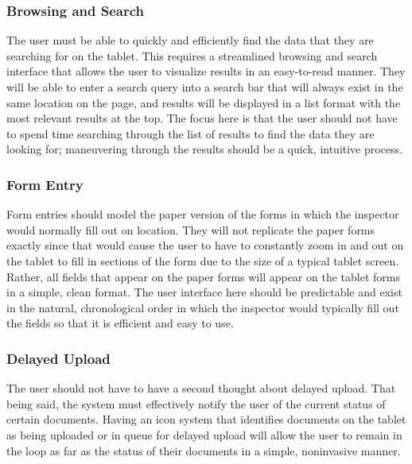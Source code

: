 \documentclass[twoside,letterpaper]{article}
\begin{document}
\subsubsection[Browsing and Search]{\rmfamily\bfseries\color{black}
Browsing and Search}
{\rmfamily\color{black}
The user must be able to quickly and efficiently find the data that they are searching for on the tablet. This requires a streamlined browsing and search interface that allows the user to visualize results in an easy-to-read manner. They will be able to enter a search query into a search bar that will always exist in the same location on the page, and results will be displayed in a list format with the most relevant results at the top. The focus here is that the user should not have to spend time searching through the list of results to find the data they are looking for; maneuvering through the results should be a quick, intuitive process.
}
\subsubsection[Form Entry]{\rmfamily\bfseries\color{black}
Form Entry}
{\rmfamily\color{black}
Form entries should model the paper version of the forms in which the inspector would normally fill out on location. They will not replicate the paper forms exactly since that would cause the user to have to constantly zoom in and out on the tablet to fill in sections of the form due to the size of a typical tablet screen. Rather, all fields that appear on the paper forms will appear on the tablet forms in a simple, clean format. The user interface here should be predictable and exist in the natural, chronological order in which the inspector would typically fill out the fields so that it is efficient and easy to use.
}
\subsubsection[Delayed Upload]{\rmfamily\bfseries\color{black}
Delayed Upload}
{\rmfamily\color{black}
The user should not have to have a second thought about delayed upload. That being said, the system must effectively notify the user of the current status of certain documents. Having an icon system that identifies documents on the tablet as being uploaded or in queue for delayed upload will allow the user to remain in the loop as far as the status of their documents in a simple, noninvasive manner.
}
\end{document}
